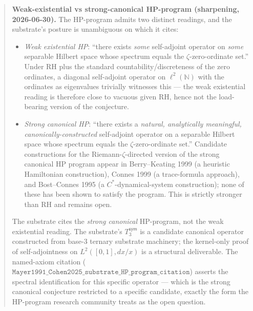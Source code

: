 \documentclass[11pt,a4paper]{amsart}
\theoremstyle{plain}
\theoremstyle{definition}
\begin{document}
\begin{abstract}
\noindent\textbf{Weak-existential vs strong-canonical HP-program (sharpening, 2026-06-30).} The HP-program admits two distinct readings, and the substrate's posture is unambiguous on which it cites:
\begin{itemize}[itemsep=2pt,leftmargin=2em]
\item \emph{Weak existential HP}: ``there exists \emph{some} self-adjoint operator on \emph{some} separable Hilbert space whose spectrum equals the $\zeta$-zero-ordinate set.'' Under RH plus the standard countability/discreteness of the zero ordinates, a diagonal self-adjoint operator on $\ell^2(\mathbb{N})$ with the ordinates as eigenvalues trivially witnesses this --- the weak existential reading is therefore close to vacuous given RH, hence not the load-bearing version of the conjecture.
\item \emph{Strong canonical HP}: ``there exists a \emph{natural, analytically meaningful, canonically-constructed} self-adjoint operator on a separable Hilbert space whose spectrum equals the $\zeta$-zero-ordinate set.'' Candidate constructions for the Riemann-$\zeta$-directed version of the strong canonical HP program appear in Berry--Keating 1999 (a heuristic Hamiltonian construction), Connes 1999 (a trace-formula approach), and Bost--Connes 1995 (a $C^*$-dynamical-system construction); none of these has been shown to satisfy the program. This is strictly stronger than RH and remains open.
\end{itemize}
The substrate cites the \emph{strong canonical} HP-program, not the weak existential reading. The substrate's $T_3^{\textsf{sym}}$ is a candidate canonical operator constructed from base-3 ternary substrate machinery; the kernel-only proof of self-adjointness on $L^2([0,1], dx/x)$ is a structural deliverable. The named-axiom citation ($\texttt{Mayer1991\_Cohen2025\_substrate\_HP\_program\_citation}$) asserts the spectral identification for this specific operator --- which is the strong canonical conjecture restricted to a specific candidate, exactly the form the HP-program research community treats as the open question.


\end{abstract}
\end{document}
